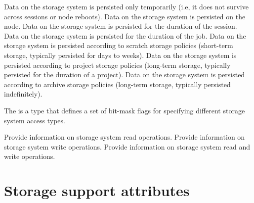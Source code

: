 \begin{constantdesc}
%
Data on the storage system is persisted only temporarily (i.e, it does not survive across sessions or node reboots).
%
Data on the storage system is persisted on the node.
%
Data on the storage system is persisted for the duration of the session.
%
Data on the storage system is persisted for the duration of the job.
%
Data on the storage system is persisted according to scratch storage policies (short-term storage, typically persisted for days to weeks).
%
Data on the storage system is persisted according to project storage policies (long-term storage, typically persisted for the duration of a project).
%
Data on the storage system is persisted according to archive storage policies (long-term storage, typically persisted indefinitely).
%
\end{constantdesc}

\provisionalMarker{}

The  is a  type that defines a set of bit-mask flags for specifying different storage system access types.

\begin{constantdesc}
%
Provide information on storage system read operations.
%
Provide information on storage system write operations.
%
Provide information on storage system read and write operations.
%
\end{constantdesc}


\section{Storage support attributes}
\label{api:struct:attributes:pstrg}

